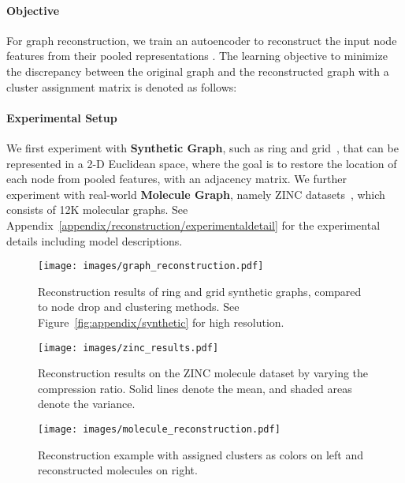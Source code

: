 \documentclass{article} \usepackage{iclr2021_conference,times}
\begin{document}
\vspace{-0.05in}
\paragraph{Objective} 
For graph reconstruction, we train an autoencoder to reconstruct the input node features  from their pooled representations . The learning objective to minimize the discrepancy between the original graph  and the reconstructed graph  with a cluster assignment matrix  is denoted as follows:


\vspace{-0.05in}
\paragraph{Experimental Setup} 
We first experiment with \textbf{Synthetic Graph}, such as ring and grid~\citep{MincutPool}, that can be represented in a 2-D Euclidean space, where the goal is to restore the location of each node from pooled features, with an adjacency matrix. We further experiment with real-world \textbf{Molecule Graph}, namely ZINC datasets~\citep{ZINC}, which consists of 12K molecular graphs. See Appendix~\ref{appendix/reconstruction/experimentaldetail} for the experimental details including model descriptions.

\begin{figure}[!t]
    \begin{minipage}{0.46\linewidth}
        \centerline{\texttt{[image: images/graph\_reconstruction.pdf]}}
        \vskip -0.16in
        \caption{\small Reconstruction results of ring and grid synthetic graphs, compared to node drop and clustering methods. See Figure~\ref{fig:appendix/synthetic} for high resolution.}
        \label{recon:synthetic}
    \end{minipage}
    \hfill
    \begin{minipage}{0.52\linewidth}
        \centerline{\texttt{[image: images/zinc\_results.pdf]}}
        \vskip -0.125in
        \caption{\small Reconstruction results on the ZINC molecule dataset by varying the compression ratio. Solid lines denote the mean, and shaded areas denote the variance.}
        \label{recon:ZINC}
    \end{minipage}
    \vskip -0.15in
\end{figure}

 
\begin{wrapfigure}{t}{0.35\textwidth}
 \centering
  \vspace{-0.17in}
  \texttt{[image: images/molecule\_reconstruction.pdf]}
  \vspace{-0.275in}
  \caption{\small Reconstruction example with assigned clusters as colors on left and reconstructed molecules on right.}
  \vspace{-0.2in}
  \label{recon:ZINC:sample}
\end{wrapfigure}
\end{document}
